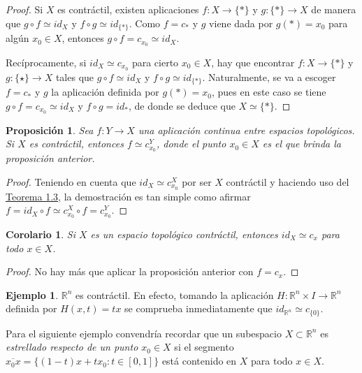 \documentclass[11pt]{report}
\newtheorem{proposition}{Proposición}[chapter]
\newtheorem{corollary}{Corolario}[chapter]
\theoremstyle{definition}
\theoremstyle{definition}
\newtheorem{example}{Ejemplo}[chapter]
\theoremstyle{remark}
\newcommand{\R}{\mathbb R}
\begin{document}
\begin{proof} Si $X$ es contráctil, existen aplicaciones $f \colon X \to \{\ast\}$ y $g \colon \{\ast\} \to X$ de manera que $g \circ f \simeq id_X$ y $f \circ g \simeq id_{\{\ast\}}$. Como $f = c_\ast$ y $g$ viene dada por $g(\ast) = x_0$ para algún $x_0 \in X$, entonces $g \circ f = c_{x_0} \simeq id_X$.

\vspace{2mm}

Recíprocamente, si $id_X \simeq c_{x_0}$ para cierto $x_0 \in X$, hay que encontrar $f \colon X \to \{\ast\}$ y $g \colon \{\star\} \to X$ tales que $g \circ f \simeq id_X$ y $f \circ g \simeq id_{\{\ast\}}$. Naturalmente, se va a escoger $f = c_\ast$ y $g$ la aplicación definida por $g(\ast) = x_0$, pues en este caso se tiene $g \circ f = c_{x_0} \simeq id_X$ y $f \circ g = id_\ast$, de donde se deduce que $X \simeq \{\ast\}$.
\end{proof}

\begin{proposition}
    Sea $f \colon Y \to X$ una aplicación continua entre espacios topológicos. Si $X$ es contráctil, entonces $f \simeq c_{x_0}^Y$, donde el punto $x_0 \in X$ es el que brinda la proposición anterior.
\end{proposition}

\begin{proof}
Teniendo en cuenta que $id_X \simeq c_{x_0}^X$ por ser $X$ contráctil y haciendo uso del \hyperref[teo1.3.]{\color{blue}Teorema 1.3}, la demostración es tan simple como afirmar $f = id_X \circ f \simeq c_{x_0}^X \circ f = c_{x_0}^Y$.
\end{proof}

\begin{corollary}
    Si $X$ es un espacio topológico contráctil, entonces $id_X \simeq c_x$ para todo $x \in X$.
\end{corollary}

\begin{proof}
    No hay más que aplicar la proposición anterior con $f = c_x$.
\end{proof}

\begin{example}
$\R^n$ es contráctil. En efecto, tomando la aplicación $H \colon \R^n \times I \to \R^n$ definida por $H(x,t) = tx$ se comprueba inmediatamente que $id_{\R^n} \simeq c_{\{0\}}$.
\end{example}

Para el siguiente ejemplo convendría recordar que un subespacio $X \subset \R^n$ es \textit{estrellado respecto de un punto $x_0 \in X$} si el segmento $\overline{x_0x} = \{(1-t)x+tx_0 \colon t \in [0,1]\}$ está contenido en $X$ para todo $x \in X$.
\end{document}
